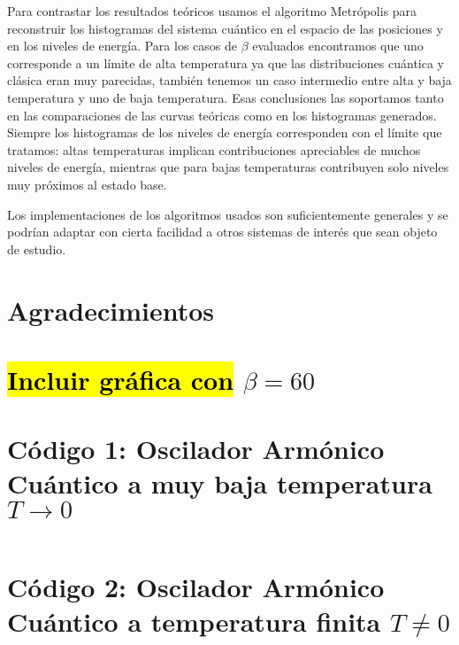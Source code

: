 \documentclass[%
 reprint,
 amsmath,amssymb,
 aps,
 pra,
]{revtex4-2}
\begin{document}
Para contrastar los resultados teóricos usamos el algoritmo Metrópolis para reconstruir los histogramas del sistema cuántico en el espacio de las posiciones y en los niveles de energía. Para los casos de $\beta$ evaluados encontramos que uno corresponde a un límite de alta temperatura ya que las distribuciones cuántica y clásica eran muy parecidas, también tenemos un caso intermedio entre alta y baja temperatura y uno de baja temperatura. Esas conclusiones las soportamos tanto en las comparaciones de las curvas teóricas como en los histogramas generados. Siempre los histogramas de los niveles de energía corresponden con el límite que tratamos: altas temperaturas implican contribuciones apreciables de muchos niveles de energía, mientras que para bajas temperaturas contribuyen solo niveles muy próximos al estado base.

Los implementaciones de los algoritmos usados son suficientemente generales y se podrían adaptar con cierta facilidad a otros sistemas de interés que sean objeto de estudio. 
\section*{Agradecimientos}

\nocite{*}


\newpage



\appendix

\begin{widetext}

\section{\hl{Incluir gráfica con} $\beta=60$}

\section{Código 1: Oscilador Armónico Cuántico a muy baja temperatura \texorpdfstring{$T \rightarrow 0$}{T tendiendo a cero}\label{appx:codigo_baja_temperatura}}

\inputminted[linenos,breaklines]{python}{code_1.py}

\section{Código 2: Oscilador Armónico Cuántico a temperatura finita \texorpdfstring{$T \neq 0$}{T diferente de cero}\label{appx:codigo_temperatura_finita}}

\inputminted[linenos,breaklines]{python}{code_2.py}

\end{widetext}
\end{document}
